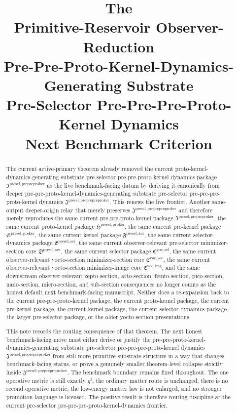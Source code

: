 \documentclass[11pt]{article}
\title{\textbf{The \TheoryName{}}\\[0.4em]
\large Primitive-Reservoir Observer-Reduction\\
\large Pre-Pre-Proto-Kernel-Dynamics-Generating Substrate\\
\large Pre-Selector Pre-Pre-Pre-Proto-Kernel Dynamics\\
\large Next Benchmark Criterion}
\author{}
\date{}
\newcommand{\CompletedMetric}{g^{\sharp}}
\newcommand{\PrePrePreProtoKernelPackage}{\mathfrak J^{\mathrm{presel,preprepreproker}}}
\newcommand{\PrePreProtoKernelPackage}{\mathfrak I^{\mathrm{presel,prepreproker}}}
\newcommand{\ProtoKernelPackage}{\mathfrak H^{\mathrm{presel,proker}}}
\newcommand{\PreKernelPackage}{\mathfrak G^{\mathrm{presel,preker}}}
\newcommand{\KernelPackage}{\mathfrak F^{\mathrm{presel,ker}}}
\newcommand{\PreSectionSelectorPackage}{\mathfrak E^{\mathrm{presel,sel}}}
\newcommand{\PreSelectorMinSectionCore}{\mathfrak D^{\mathrm{presel,sec}}}
\newcommand{\YoctoSelectorPackage}{\mathfrak C^{\mathrm{yoc,sel}}}
\newcommand{\YoctoImageCore}{\mathfrak C^{\mathrm{yoc,img}}}
\newcommand{\YoctoMinSectionCore}{\mathfrak C^{\mathrm{yoc,sec}}}
\begin{document}
\maketitle

\begin{abstract}
The current active-primary theorem already removed the current proto-kernel-dynamics-generating substrate pre-selector pre-pre-proto-kernel dynamics package \(\PrePreProtoKernelPackage\) as the live benchmark-facing datum by deriving it canonically from deeper pre-pre-proto-kernel-dynamics-generating substrate pre-selector pre-pre-pre-proto-kernel dynamics \(\PrePrePreProtoKernelPackage\). This renews the live frontier. Another same-output deeper-origin relay that merely preserves \(\PrePrePreProtoKernelPackage\) and therefore merely reproduces the same current pre-pre-proto-kernel package \(\PrePreProtoKernelPackage\), the same current proto-kernel package \(\ProtoKernelPackage\), the same current pre-kernel package \(\PreKernelPackage\), the same current kernel package \(\KernelPackage\), the same current selector-dynamics package \(\PreSectionSelectorPackage\), the same current observer-relevant pre-selector minimizer-section core \(\PreSelectorMinSectionCore\), the same current selector package \(\YoctoSelectorPackage\), the same current observer-relevant yocto-section minimizer-section core \(\YoctoMinSectionCore\), the same current observer-relevant yocto-section minimizer-image core \(\YoctoImageCore\), and the same downstream observer-relevant zepto-section, atto-section, femto-section, pico-section, nano-section, micro-section, and sub-section consequences no longer counts as the honest default next benchmark-facing manuscript. Neither does a re-expansion back to the current pre-pre-proto-kernel package, the current proto-kernel package, the current pre-kernel package, the current kernel package, the current selector-dynamics package, the larger pre-selector package, or the older yocto-section presentations.

This note records the routing consequence of that theorem. The next honest benchmark-facing move must either derive or justify the pre-pre-proto-kernel-dynamics-generating substrate pre-selector pre-pre-pre-proto-kernel dynamics \(\PrePrePreProtoKernelPackage\) from still more primitive substrate structure in a way that changes benchmark-facing status, or prove a genuinely smaller theorem-level collapse strictly inside \(\PrePrePreProtoKernelPackage\). The benchmark boundary remains fixed throughout. The one operative metric is still exactly \(\CompletedMetric\), the ordinary matter route is unchanged, there is no second operative metric, the low-energy matter law is not enlarged, and no stronger promotion language is licensed. The positive result is therefore routing discipline at the current pre-selector pre-pre-pre-proto-kernel-dynamics frontier.
\end{abstract}
\end{document}
